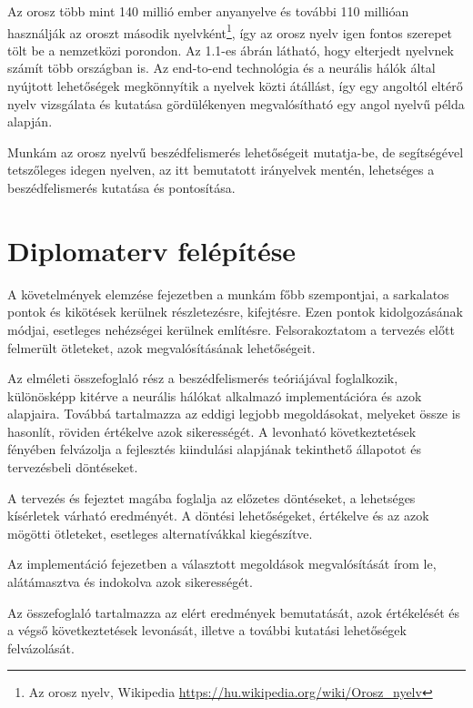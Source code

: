 Az orosz több mint 140 millió ember anyanyelve és további 110 millióan használják az oroszt második nyelvként\footnote{Az orosz nyelv, Wikipedia \url{https://hu.wikipedia.org/wiki/Orosz_nyelv}}, így az orosz nyelv igen fontos szerepet tölt be a nemzetközi porondon. Az 1.1-es ábrán látható, hogy elterjedt nyelvnek számít több országban is. Az end-to-end technológia és a neurális hálók által nyújtott lehetőségek megkönnyítik a nyelvek közti átállást, így egy angoltól eltérő nyelv vizsgálata és kutatása gördülékenyen megvalósítható egy angol nyelvű példa alapján.

Munkám az orosz nyelvű beszédfelismerés lehetőségeit mutatja-be, de segítségével tetszőleges idegen nyelven, az itt bemutatott irányelvek mentén, lehetséges a beszédfelismerés kutatása és pontosítása.

\section{Diplomaterv felépítése}

A követelmények elemzése fejezetben a munkám főbb szempontjai, a sarkalatos pontok és kikötések kerülnek részletezésre, kifejtésre. Ezen pontok kidolgozásának módjai, esetleges nehézségei kerülnek említésre. Felsorakoztatom a tervezés előtt felmerült ötleteket, azok megvalósításának lehetőségeit.

Az elméleti összefoglaló rész a beszédfelismerés teóriájával foglalkozik, különösképp kitérve a neurális hálókat alkalmazó implementációra és azok alapjaira. Továbbá tartalmazza az eddigi legjobb megoldásokat, melyeket össze is hasonlít, röviden értékelve azok sikerességét. A levonható következtetések fényében felvázolja a fejlesztés kiindulási alapjának tekinthető állapotot és tervezésbeli döntéseket.

A tervezés és fejeztet magába foglalja az előzetes döntéseket, a lehetséges kísérletek várható eredményét. A döntési lehetőségeket, értékelve és az azok mögötti ötleteket, esetleges alternatívákkal kiegészítve.

Az implementáció fejezetben a választott megoldások megvalósítását írom le, alátámasztva és indokolva azok sikerességét.

Az összefoglaló tartalmazza az elért eredmények bemutatását, azok értékelését és a végső következtetések levonását, illetve a további kutatási lehetőségek felvázolását.